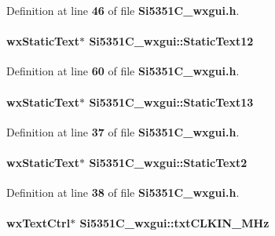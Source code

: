 Definition at line {\bf 46} of file {\bf Si5351\+C\+\_\+wxgui.\+h}.

\paragraph[{Static\+Text12}]{\setlength{\rightskip}{0pt plus 5cm}wx\+Static\+Text$\ast$ Si5351\+C\+\_\+wxgui\+::\+Static\+Text12}\label{classSi5351C__wxgui_a9dd4a637ce63b1eecaefd9cbce821bc8}


Definition at line {\bf 60} of file {\bf Si5351\+C\+\_\+wxgui.\+h}.

\paragraph[{Static\+Text13}]{\setlength{\rightskip}{0pt plus 5cm}wx\+Static\+Text$\ast$ Si5351\+C\+\_\+wxgui\+::\+Static\+Text13}\label{classSi5351C__wxgui_a5c0c41f4eb56bb6cc655d6768149eed3}


Definition at line {\bf 37} of file {\bf Si5351\+C\+\_\+wxgui.\+h}.

\paragraph[{Static\+Text2}]{\setlength{\rightskip}{0pt plus 5cm}wx\+Static\+Text$\ast$ Si5351\+C\+\_\+wxgui\+::\+Static\+Text2}\label{classSi5351C__wxgui_a3af977443c8cb6ef93226fdd384b0c54}


Definition at line {\bf 38} of file {\bf Si5351\+C\+\_\+wxgui.\+h}.

\paragraph[{txt\+C\+L\+K\+I\+N\+\_\+\+M\+Hz}]{\setlength{\rightskip}{0pt plus 5cm}wx\+Text\+Ctrl$\ast$ Si5351\+C\+\_\+wxgui\+::txt\+C\+L\+K\+I\+N\+\_\+\+M\+Hz}\label{classSi5351C__wxgui_ae99304cb5c0b52c1a1473c0afa19b2db}



